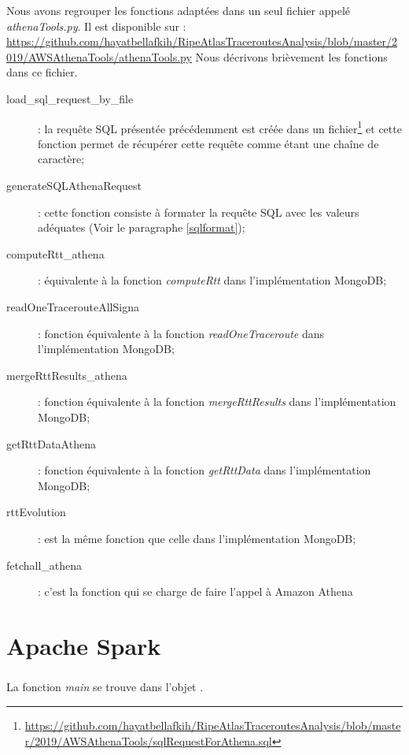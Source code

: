 \documentclass[]{report}
\begin{document}
Nous avons regrouper les fonctions adaptées  dans un seul fichier appelé \textit{athenaTools.py}. Il est disponible sur : 
\url{https://github.com/hayatbellafkih/RipeAtlasTraceroutesAnalysis/blob/master/2019/AWSAthenaTools/athenaTools.py} Nous décrivons brièvement les fonctions dans ce fichier.

\begin{description}
	\item[load\_sql\_request\_by\_file] : la requête SQL présentée précédemment est créée dans un fichier\footnote{\url{https://github.com/hayatbellafkih/RipeAtlasTraceroutesAnalysis/blob/master/2019/AWSAthenaTools/sqlRequestForAthena.sql}} et cette fonction permet de récupérer cette requête comme étant une chaîne de caractère;
	
	\item[generateSQLAthenaRequest] : cette fonction consiste à formater la requête SQL avec les  valeurs adéquates (Voir le paragraphe \ref{sqlformat});
	
	\item[computeRtt\_athena] : équivalente à  la fonction  \textit{computeRtt}  dans l'implémentation MongoDB;
	
	\item[readOneTracerouteAllSigna] : fonction équivalente à  la fonction \textit{readOneTraceroute} dans l'implémentation MongoDB;
	
	\item[mergeRttResults\_athena] : fonction équivalente à la fonction \textit{mergeRttResults}  dans l'implémentation MongoDB;
	
	\item[getRttDataAthena] :  fonction équivalente à la fonction \textit{getRttData}  dans l'implémentation MongoDB;
	
	\item[rttEvolution] : est la même fonction que celle dans l'implémentation MongoDB;
	
	\item[fetchall\_athena] : c'est la fonction qui se charge de faire l'appel à Amazon Athena 
\end{description}


\chapter{Apache Spark}
\paragraph{}
La fonction \textit{main} se trouve dans l'objet .
\end{document}
